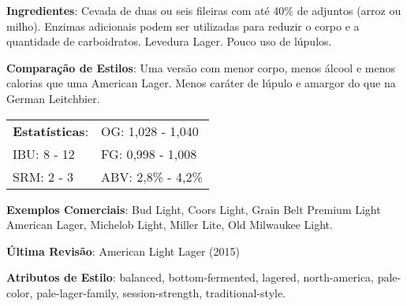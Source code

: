 \textbf{Ingredientes}: Cevada de duas ou seis fileiras com até 40\% de adjuntos (arroz ou milho). Enzimas adicionais podem ser utilizadas para reduzir o corpo e a quantidade de carboidratos. Levedura Lager. Pouco uso de lúpulos.

\textbf{Comparação de Estilos}: Uma versão com menor corpo, menos álcool e menos calorias que uma American Lager. Menos caráter de lúpulo e amargor do que na German Leitchbier.

\begin{tabular}{@{}p{35mm}p{35mm}@{}}
  \textbf{Estatísticas}: & OG: 1,028 - 1,040 \\
  IBU: 8 - 12  & FG: 0,998 - 1,008 \\
  SRM: 2 - 3  & ABV: 2,8\% - 4,2\%
\end{tabular}

\textbf{Exemplos Comerciais}: Bud Light, Coors Light, Grain Belt Premium Light American Lager, Michelob Light, Miller Lite, Old Milwaukee Light.

\textbf{Última Revisão}: American Light Lager (2015)

\textbf{Atributos de Estilo}: balanced, bottom-fermented, lagered, north-america, pale-color, pale-lager-family, session-strength, traditional-style.